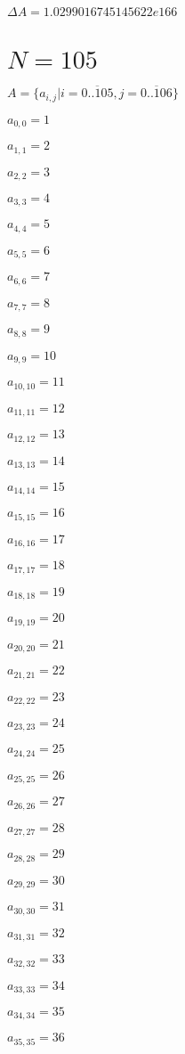 \documentclass[a4paper,12pt]{article}
\begin{document}
$\Delta A = 1.0299016745145622e166$



\section{ $N = 105$ }
$A = \{ a _{ i, j } | i = \overline { 0..105 }, j = \overline { 0..106 } \}$

$a _{ 0, 0 } = 1$

$a _{ 1, 1 } = 2$

$a _{ 2, 2 } = 3$

$a _{ 3, 3 } = 4$

$a _{ 4, 4 } = 5$

$a _{ 5, 5 } = 6$

$a _{ 6, 6 } = 7$

$a _{ 7, 7 } = 8$

$a _{ 8, 8 } = 9$

$a _{ 9, 9 } = 10$

$a _{ 10, 10 } = 11$

$a _{ 11, 11 } = 12$

$a _{ 12, 12 } = 13$

$a _{ 13, 13 } = 14$

$a _{ 14, 14 } = 15$

$a _{ 15, 15 } = 16$

$a _{ 16, 16 } = 17$

$a _{ 17, 17 } = 18$

$a _{ 18, 18 } = 19$

$a _{ 19, 19 } = 20$

$a _{ 20, 20 } = 21$

$a _{ 21, 21 } = 22$

$a _{ 22, 22 } = 23$

$a _{ 23, 23 } = 24$

$a _{ 24, 24 } = 25$

$a _{ 25, 25 } = 26$

$a _{ 26, 26 } = 27$

$a _{ 27, 27 } = 28$

$a _{ 28, 28 } = 29$

$a _{ 29, 29 } = 30$

$a _{ 30, 30 } = 31$

$a _{ 31, 31 } = 32$

$a _{ 32, 32 } = 33$

$a _{ 33, 33 } = 34$

$a _{ 34, 34 } = 35$

$a _{ 35, 35 } = 36$
\end{document}
